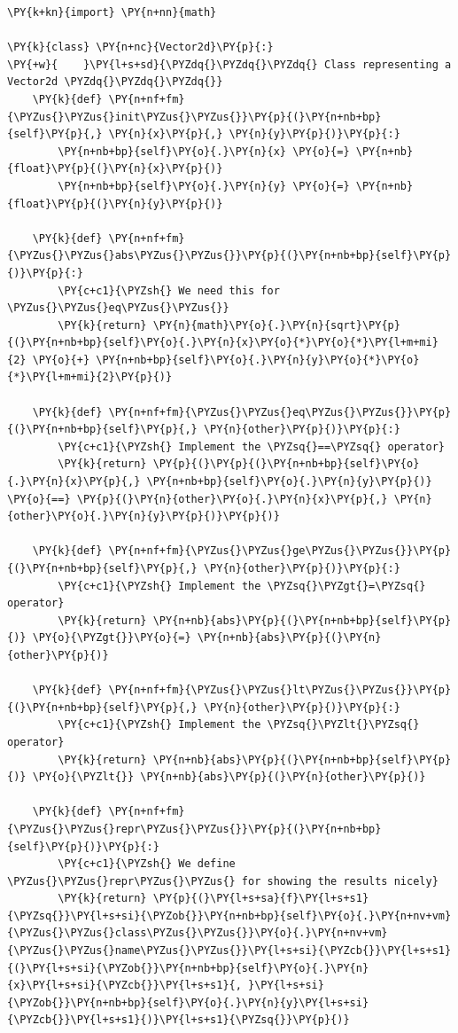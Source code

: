 \begin{Verbatim}[label=\makebox{\url{https://github.com/lucabaldini/cmepda/tree/master/slides/latex/snippets/vector2d\_comparable.py}},commandchars=\\\{\}]
\PY{k+kn}{import} \PY{n+nn}{math}

\PY{k}{class} \PY{n+nc}{Vector2d}\PY{p}{:}
\PY{+w}{    }\PY{l+s+sd}{\PYZdq{}\PYZdq{}\PYZdq{} Class representing a Vector2d \PYZdq{}\PYZdq{}\PYZdq{}}
    \PY{k}{def} \PY{n+nf+fm}{\PYZus{}\PYZus{}init\PYZus{}\PYZus{}}\PY{p}{(}\PY{n+nb+bp}{self}\PY{p}{,} \PY{n}{x}\PY{p}{,} \PY{n}{y}\PY{p}{)}\PY{p}{:}
        \PY{n+nb+bp}{self}\PY{o}{.}\PY{n}{x} \PY{o}{=} \PY{n+nb}{float}\PY{p}{(}\PY{n}{x}\PY{p}{)}
        \PY{n+nb+bp}{self}\PY{o}{.}\PY{n}{y} \PY{o}{=} \PY{n+nb}{float}\PY{p}{(}\PY{n}{y}\PY{p}{)}

    \PY{k}{def} \PY{n+nf+fm}{\PYZus{}\PYZus{}abs\PYZus{}\PYZus{}}\PY{p}{(}\PY{n+nb+bp}{self}\PY{p}{)}\PY{p}{:}
        \PY{c+c1}{\PYZsh{} We need this for \PYZus{}\PYZus{}eq\PYZus{}\PYZus{}}
        \PY{k}{return} \PY{n}{math}\PY{o}{.}\PY{n}{sqrt}\PY{p}{(}\PY{n+nb+bp}{self}\PY{o}{.}\PY{n}{x}\PY{o}{*}\PY{o}{*}\PY{l+m+mi}{2} \PY{o}{+} \PY{n+nb+bp}{self}\PY{o}{.}\PY{n}{y}\PY{o}{*}\PY{o}{*}\PY{l+m+mi}{2}\PY{p}{)}

    \PY{k}{def} \PY{n+nf+fm}{\PYZus{}\PYZus{}eq\PYZus{}\PYZus{}}\PY{p}{(}\PY{n+nb+bp}{self}\PY{p}{,} \PY{n}{other}\PY{p}{)}\PY{p}{:}
        \PY{c+c1}{\PYZsh{} Implement the \PYZsq{}==\PYZsq{} operator}
        \PY{k}{return} \PY{p}{(}\PY{p}{(}\PY{n+nb+bp}{self}\PY{o}{.}\PY{n}{x}\PY{p}{,} \PY{n+nb+bp}{self}\PY{o}{.}\PY{n}{y}\PY{p}{)} \PY{o}{==} \PY{p}{(}\PY{n}{other}\PY{o}{.}\PY{n}{x}\PY{p}{,} \PY{n}{other}\PY{o}{.}\PY{n}{y}\PY{p}{)}\PY{p}{)}

    \PY{k}{def} \PY{n+nf+fm}{\PYZus{}\PYZus{}ge\PYZus{}\PYZus{}}\PY{p}{(}\PY{n+nb+bp}{self}\PY{p}{,} \PY{n}{other}\PY{p}{)}\PY{p}{:}
        \PY{c+c1}{\PYZsh{} Implement the \PYZsq{}\PYZgt{}=\PYZsq{} operator}
        \PY{k}{return} \PY{n+nb}{abs}\PY{p}{(}\PY{n+nb+bp}{self}\PY{p}{)} \PY{o}{\PYZgt{}}\PY{o}{=} \PY{n+nb}{abs}\PY{p}{(}\PY{n}{other}\PY{p}{)}

    \PY{k}{def} \PY{n+nf+fm}{\PYZus{}\PYZus{}lt\PYZus{}\PYZus{}}\PY{p}{(}\PY{n+nb+bp}{self}\PY{p}{,} \PY{n}{other}\PY{p}{)}\PY{p}{:}
        \PY{c+c1}{\PYZsh{} Implement the \PYZsq{}\PYZlt{}\PYZsq{} operator}
        \PY{k}{return} \PY{n+nb}{abs}\PY{p}{(}\PY{n+nb+bp}{self}\PY{p}{)} \PY{o}{\PYZlt{}} \PY{n+nb}{abs}\PY{p}{(}\PY{n}{other}\PY{p}{)}

    \PY{k}{def} \PY{n+nf+fm}{\PYZus{}\PYZus{}repr\PYZus{}\PYZus{}}\PY{p}{(}\PY{n+nb+bp}{self}\PY{p}{)}\PY{p}{:}
        \PY{c+c1}{\PYZsh{} We define \PYZus{}\PYZus{}repr\PYZus{}\PYZus{} for showing the results nicely}
        \PY{k}{return} \PY{p}{(}\PY{l+s+sa}{f}\PY{l+s+s1}{\PYZsq{}}\PY{l+s+si}{\PYZob{}}\PY{n+nb+bp}{self}\PY{o}{.}\PY{n+nv+vm}{\PYZus{}\PYZus{}class\PYZus{}\PYZus{}}\PY{o}{.}\PY{n+nv+vm}{\PYZus{}\PYZus{}name\PYZus{}\PYZus{}}\PY{l+s+si}{\PYZcb{}}\PY{l+s+s1}{(}\PY{l+s+si}{\PYZob{}}\PY{n+nb+bp}{self}\PY{o}{.}\PY{n}{x}\PY{l+s+si}{\PYZcb{}}\PY{l+s+s1}{, }\PY{l+s+si}{\PYZob{}}\PY{n+nb+bp}{self}\PY{o}{.}\PY{n}{y}\PY{l+s+si}{\PYZcb{}}\PY{l+s+s1}{)}\PY{l+s+s1}{\PYZsq{}}\PY{p}{)}
\end{Verbatim}
